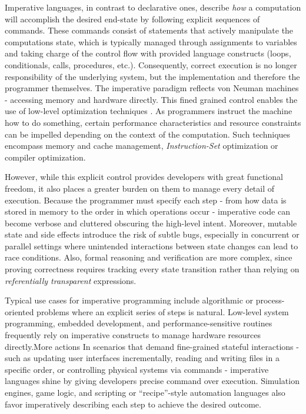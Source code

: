 Imperative languages, in contrast to declarative ones, describe \textit{how} a computation will accomplish the desired end-state by following explicit sequences
of commands. These commands consist of statements that actively manipulate the computations state, which is typically managed through assignments to variables
and taking charge of the control flow with provided language constructs (loops, conditionals, calls, procedures, etc.).
Consequently, correct execution is no longer responsibility of the underlying system, but the implementation and therefore the programmer themselves. The imperative paradigm
reflects von Neuman machines - accessing memory and hardware directly. This fined grained control enables the use of low-level optimization techniques \cite{lowLvelOpt}.
As programmers instruct the machine how to do something, certain performance characteristics and resource constraints can be impelled depending on the context of the computation.
Such techniques encompass memory and cache management, \textit{Instruction-Set} optimization or compiler optimization.

However, while this explicit control provides developers with great functional freedom, it also places a greater burden on them to manage every detail of execution.
Because the programmer must specify each step - from how data is stored in memory to the order in which operations occur - imperative code can become verbose and cluttered obscuring the high-level intent.
Moreover, mutable state and side effects introduce the risk of subtle bugs, especially in concurrent or parallel settings where unintended interactions between state changes
can lead to race conditions. Also, formal reasoning and verification are more complex, since proving correctness requires tracking every state
transition rather than relying on \textit{referentially transparent} expressions.

Typical use cases for imperative programming include algorithmic or process-oriented problems where an explicit series of steps is natural.
Low-level system programming, embedded development, and performance-sensitive routines frequently rely on imperative constructs to manage hardware resources directly.More actions
In scenarios that demand fine-grained stateful interactions - such as updating user interfaces incrementally, reading and writing files in a specific order, or
controlling physical systems via commands - imperative languages shine by giving developers precise command over execution.
Simulation engines, game logic, and scripting or “recipe”-style automation languages also favor imperatively describing each step to achieve the desired outcome.

